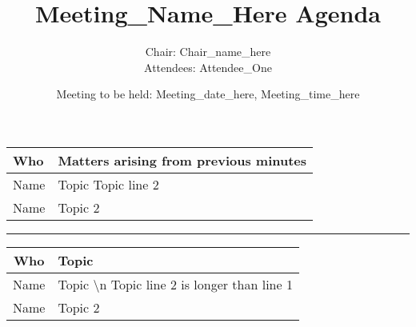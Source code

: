\documentclass[]{article}
\title{Meeting\_Name\_Here Agenda}
\author{Chair: Chair\_name\_here\\
Attendees: Attendee\_One}
\date{Meeting to be held: Meeting\_date\_here, Meeting\_time\_here}
\begin{document}
\maketitle

\begin{longtable}[]{@{}ll@{}}
\toprule
\begin{minipage}[b]{0.16\columnwidth}\raggedright\strut
Who\strut
\end{minipage} & \begin{minipage}[b]{0.52\columnwidth}\raggedright\strut
Matters arising from previous minutes\strut
\end{minipage}\tabularnewline
\midrule
\endhead
\begin{minipage}[t]{0.16\columnwidth}\raggedright\strut
Name\strut
\end{minipage} & \begin{minipage}[t]{0.52\columnwidth}\raggedright\strut
Topic Topic line 2\strut
\end{minipage}\tabularnewline
\begin{minipage}[t]{0.16\columnwidth}\raggedright\strut
Name\strut
\end{minipage} & \begin{minipage}[t]{0.52\columnwidth}\raggedright\strut
Topic 2\strut
\end{minipage}\tabularnewline
\bottomrule
\end{longtable}

\begin{center}\rule{0.5\linewidth}{\linethickness}\end{center}

\begin{longtable}[]{@{}cl@{}}
\toprule
\begin{minipage}[b]{0.17\columnwidth}\centering\strut
Who\strut
\end{minipage} & \begin{minipage}[b]{0.20\columnwidth}\raggedright\strut
Topic\strut
\end{minipage}\tabularnewline
\midrule
\endhead
\begin{minipage}[t]{0.17\columnwidth}\centering\strut
Name\strut
\end{minipage} & \begin{minipage}[t]{0.20\columnwidth}\raggedright\strut
Topic \textbackslash{}n Topic line 2 is longer than line 1\strut
\end{minipage}\tabularnewline
\begin{minipage}[t]{0.17\columnwidth}\centering\strut
Name\strut
\end{minipage} & \begin{minipage}[t]{0.20\columnwidth}\raggedright\strut
Topic 2\strut
\end{minipage}\tabularnewline
\bottomrule
\end{longtable}
\end{document}
